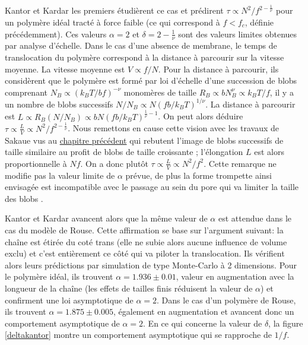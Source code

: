 Kantor et Kardar les premiers étudièrent ce cas \cite{Kantor2004} et prédirent $\tau \propto N^2/f^{2-\frac{1}{\nu}}$ pour un polymère idéal tracté à force faible (ce qui correspond à $f<f_c$, définie précédemment). Ces valeurs $\alpha=2$ et $\delta=2-\frac{1}{\nu}$ sont des valeurs limites obtenues par analyse d'échelle. Dans le cas d'une absence de membrane, le temps de translocation du polymère correspond à la distance à parcourir sur la vitesse moyenne. La vitesse moyenne est $V \propto f/N$. Pour la distance à parcourir, ils considèrent que le polymère est formé par loi d'échelle d'une succession de blobs comprenant $N_{B} \propto (k_BT/bf)^{-\nu}$ monomères de taille $ R_{B} \propto bN_B^{\nu}\propto k_BT/f$, il y a un nombre de blobs successifs $N/N_B \propto N (fb/k_BT)^{1/\nu}$. La distance à parcourir est  $L \propto R_B(N/N_B) \propto bN(fb/k_BT)^{\frac{1}{\nu}-1} $. On peut alors déduire $\tau \propto \frac{L}{V} \propto N^2/f^{2-\frac{1}{\nu}}$. Nous remettons en cause cette vision avec les travaux de Sakaue \cite{Sakaue2012} vus au \hyperref[fc]{chapitre précédent} qui rebutent l'image de blobs successifs de taille similaire au profit de blobs de taille croissante ; l'élongation $L$ est alors proportionnelle à $Nf$. On a donc plutôt $\tau \propto \frac{L}{V} \propto N^2/f^{2}$. Cette remarque ne modifie pas la valeur limite de $\alpha$ prévue,  de plus la forme trompette ainsi envisagée est incompatible avec le passage au sein du pore qui va limiter la taille des blobs .

 Kantor et Kardar avancent alors que la même valeur de $\alpha$ est attendue dans le cas du modèle de Rouse. Cette affirmation se base sur l'argument suivant: la chaîne est étirée du coté trans (elle ne subie alors aucune influence de volume exclu) et c'est entièrement ce côté qui va piloter la translocation. Ils vérifient alors leurs prédictions par simulation de type Monte-Carlo à 2 dimensions. Pour le polymère idéal, ils trouvent $\alpha =1.936 \pm 0.01$, valeur en augmentation avec la longueur de la chaîne (les effets de tailles finis réduisent la valeur de $\alpha$) et confirment une loi asymptotique de $\alpha=2$. Dans le cas d'un polymère de Rouse, ils trouvent $\alpha =  1.875 \pm 0.005$, également en augmentation et avancent donc un comportement asymptotique de $\alpha=2$. En ce qui concerne la valeur de $\delta$, la figure \ref{deltakantor} montre un comportement asymptotique qui se rapproche de $1/f$. 
 

